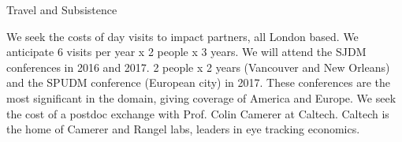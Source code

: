 Travel and Subsistence

We seek the costs of day visits to impact partners, all London based. We anticipate 6 visits per year x 2 people x 3 years. We will attend the SJDM conferences in 2016 and 2017. 2
people x 2 years (Vancouver and New Orleans) and the SPUDM conference (European city)
in 2017. These conferences are the most significant in the domain, giving coverage of
America and Europe. We seek the cost of a postdoc exchange with Prof. Colin Camerer at
Caltech. Caltech is the home of Camerer and Rangel labs, leaders in eye tracking economics.


